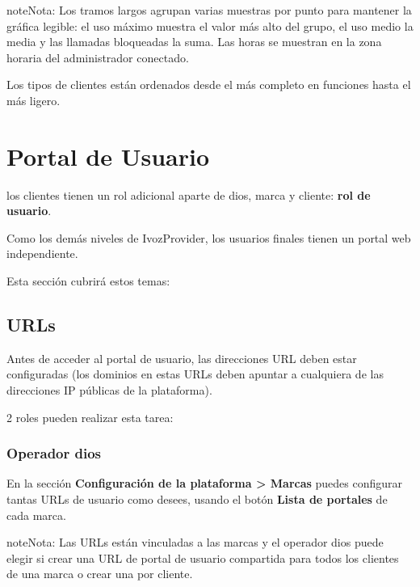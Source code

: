 \documentclass[letterpaper,10pt,spanish]{sphinxmanual}
\begin{document}
\begin{notice}{note}{Nota:}
Los tramos largos agrupan varias muestras por punto para mantener la gráfica legible: el uso máximo muestra el valor más alto del grupo, el uso medio la media y las llamadas bloqueadas la suma. Las horas se muestran en la zona horaria del administrador conectado.
\end{notice}

Los tipos de clientes están ordenados desde el más completo en funciones hasta el más ligero.


\chapter{Portal de Usuario}
\label{user_portal/index:userportal}\label{user_portal/index:user-portal}\label{user_portal/index::doc}
{\hyperref[administration_portal/brand/clients/virtual_pbx:virtual\string-pbx]{}} los clientes tienen un rol adicional aparte de dios, marca y cliente: \textbf{rol de usuario}.

Como los demás niveles de IvozProvider, los usuarios finales tienen un portal web independiente.

Esta sección cubrirá estos temas:


\section{URLs}
\label{user_portal/urls::doc}\label{user_portal/urls:urls}
Antes de acceder al portal de usuario, las direcciones URL deben estar configuradas (los dominios en estas URLs deben apuntar a cualquiera de las direcciones IP públicas de la plataforma).

2 roles pueden realizar esta tarea:


\subsection{Operador dios}
\label{user_portal/urls:god-operator}
En la sección \textbf{Configuración de la plataforma \textgreater{} Marcas} puedes configurar tantas URLs de usuario como desees, usando el botón \textbf{Lista de portales} de cada marca.

\begin{notice}{note}{Nota:}
Las URLs están vinculadas a las marcas y el operador dios puede elegir si crear una URL de portal de usuario compartida para todos los clientes de una marca o crear una por cliente.
\end{notice}
\end{document}
